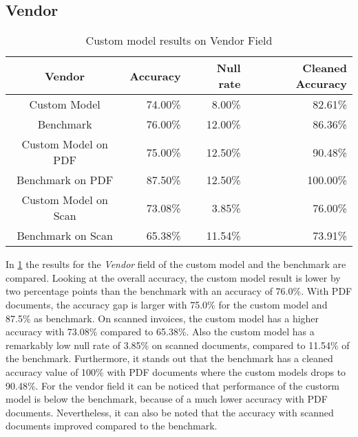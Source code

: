 \subsection*{Vendor}
\begin{table}[ht]   %
    \centering
    \footnotesize
    \begin{tabular}{c|rrr} %
        \toprule    %
        Vendor  & Accuracy  & Null rate & Cleaned Accuracy \\
        \midrule    %
        Custom Model               & 74.00\%   & 8.00\%   & 82.61\% \\
        Benchmark           & 76.00\%   & 12.00\%  & 86.36\%\\
        \midrule    %
        Custom Model on PDF        & 75.00\%   & 12.50\%  & 90.48\% \\
        Benchmark on PDF    & 87.50\%   & 12.50\%  & 100.00\% \\
        \midrule    %
        Custom Model on Scan       & 73.08\%  & 3.85\%   & 76.00\% \\
        Benchmark on Scan   & 65.38\%  & 11.54\%  & 73.91\% \\

        \bottomrule %
    \end{tabular}
    \caption{Custom model results on Vendor Field}
    \label{table:Model_Bench_Vendor}
\end{table}

In \cref{table:Model_Bench_Vendor} the results for the \textit{Vendor} field of the custom model and the benchmark are compared. 
Looking at the overall accuracy, the custom model result is lower by two percentage points than the benchmark with an accuracy of 76.0\%. 
With PDF documents, the accuracy gap is larger with 75.0\% for the custom model and 87.5\% as benchmark. 
On scanned invoices, the custom model has a higher accuracy with 73.08\% compared to 65.38\%. 
Also the custom model has a remarkably low null rate of 3.85\% on scanned documents, compared to 11.54\% of the benchmark.
Furthermore, it stands out that the benchmark has a cleaned accuracy value of 100\% with PDF documents where the custom models drops to 90.48\%.
For the vendor field it can be noticed that performance of the custorm model is below the benchmark, because of a much lower accuracy with PDF documents.
Nevertheless, it can also be noted that the accuracy with scanned documents improved compared to the benchmark.

